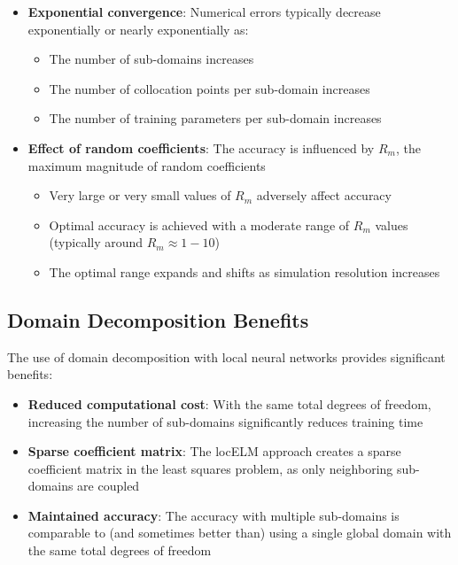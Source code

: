 \documentclass[11pt,a4paper]{article}
\begin{document}
\begin{itemize}
    \item \textbf{Exponential convergence}: Numerical errors typically decrease exponentially or nearly exponentially as:
    \begin{itemize}
        \item The number of sub-domains increases
        \item The number of collocation points per sub-domain increases
        \item The number of training parameters per sub-domain increases
    \end{itemize}
    
    \item \textbf{Effect of random coefficients}: The accuracy is influenced by $R_m$, the maximum magnitude of random coefficients
    \begin{itemize}
        \item Very large or very small values of $R_m$ adversely affect accuracy
        \item Optimal accuracy is achieved with a moderate range of $R_m$ values (typically around $R_m \approx 1-10$)
        \item The optimal range expands and shifts as simulation resolution increases
    \end{itemize}
\end{itemize}

\subsection{Domain Decomposition Benefits}
The use of domain decomposition with local neural networks provides significant benefits:

\begin{itemize}
    \item \textbf{Reduced computational cost}: With the same total degrees of freedom, increasing the number of sub-domains significantly reduces training time
    
    \item \textbf{Sparse coefficient matrix}: The locELM approach creates a sparse coefficient matrix in the least squares problem, as only neighboring sub-domains are coupled
    
    \item \textbf{Maintained accuracy}: The accuracy with multiple sub-domains is comparable to (and sometimes better than) using a single global domain with the same total degrees of freedom
\end{itemize}
\end{document}

